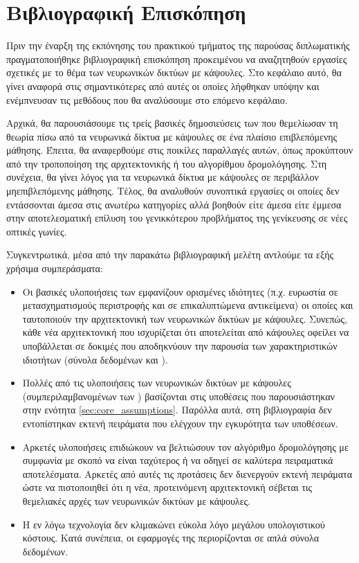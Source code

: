 \chapter{Βιβλιογραφική Επισκόπηση}
\label{chap:related_work}

Πριν την έναρξη της εκπόνησης του πρακτικού τμήματος της παρούσας διπλωματικής πραγματοποιήθηκε βιβλιογραφική επισκόπηση προκειμένου να αναζητηθούν εργασίες σχετικές με το θέμα των νευρωνικών δικτύων με κάψουλες. Στο κεφάλαιο αυτό, θα γίνει αναφορά στις σημαντικότερες από αυτές οι οποίες λήφθηκαν υπόψην και ενέμπνευσαν τις μεθόδους που θα αναλύσουμε στο επόμενο κεφάλαιο. \par

Αρχικά, θα παρουσιάσουμε τις τρείς βασικές δημοσιεύσεις των  \cite{hinton2011transforming, sabour2017dynamic, hinton2018matrix} που θεμελίωσαν τη θεωρία πίσω από τα νευρωνικά δίκτυα με κάψουλες σε ένα πλαίσιο επιβλεπόμενης μάθησης. Έπειτα, θα αναφερθούμε στις ποικίλες παραλλαγές αυτών, όπως προκύπτουν από την τροποποίηση της αρχιτεκτονικής ή του αλγορίθμου δρομολόγησης. Στη συνέχεια, θα γίνει λόγος για τα νευρωνικά δίκτυα με κάψουλες σε περιβάλλον μη\textendash επιβλεπόμενης μάθησης. Τέλος, θα αναλυθούν συνοπτικά εργασίες οι οποίες δεν εντάσσονται άμεσα στις ανωτέρω κατηγορίες αλλά βοηθούν είτε άμεσα είτε έμμεσα στην αποτελεσματική επίλυση του γενικκότερου προβλήματος της γενίκευσης σε νέες οπτικές γωνίες.\par

Συγκεντρωτικά, μέσα από την παρακάτω βιβλιογραφική μελέτη αντλούμε τα εξής χρήσιμα συμπεράσματα:
\begin{itemize}
    \item Οι βασικές υλοποιήσεις των  εμφανίζουν ορισμένες ιδιότητες (π.χ. ευρωστία σε μετασχηματισμούς περιστροφής και σε επικαλυπτώμενα αντικείμενα) οι οποίες και ταυτοποιούν την αρχιτεκτονική των νευρωνικών δικτύων με κάψουλες. Συνεπώς, κάθε νέα αρχιτεκτονική που ισχυρίζεται ότι αποτελείται από κάψουλες οφείλει να υποβάλλεται σε δοκιμές που αποδηκνύουν την παρουσία των χαρακτηριστικών ιδιοτήτων (σύνολα δεδομένων  και ).
    \item Πολλές από τις υλοποιήσεις των νευρωνικών δικτύων με κάψουλες (συμπεριλαμβανομένων των \cite{hinton2011transforming, sabour2017dynamic, hinton2018matrix}) βασίζονται στις υποθέσεις που παρουσιάστηκαν στην ενότητα \ref{sec:core_assumptions}. Παρόλλα αυτά, στη βιβλιογραφία δεν εντοπίστηκαν εκτενή πειράματα που ελέγχουν την εγκυρότητα των υποθέσεων.
    \item Αρκετές υλοποιήσεις επιδιώκουν να βελτιώσουν τον αλγόριθμο δρομολόγησης με συμφωνία με σκοπό να είναι ταχύτερος ή να οδηγεί σε καλύτερα πειραματικά αποτελέσματα. Αρκετές από αυτές τις προτάσεις δεν διενεργούν εκτενή πειράματα ώστε να πιστοποιηθεί ότι η νέα, προτεινόμενη αρχιτεκτονική σέβεται τις θεμελιακές αρχές των νευρωνικών δικτύων με κάψουλες.
    \item Η εν λόγω τεχνολογία δεν κλιμακώνει εύκολα λόγο μεγάλου υπολογιστικού κόστους. Κατά συνέπεια, οι εφαρμογές της περιορίζονται σε απλά σύνολα δεδομένων.
\end{itemize}


